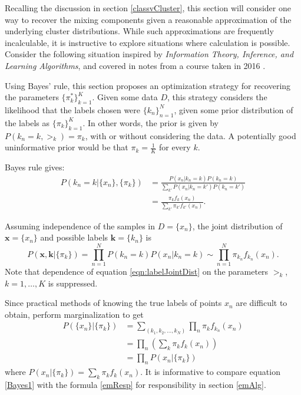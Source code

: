 Recalling the discussion in section \ref{classvCluster}, this section will consider one way to recover the mixing components given a reasonable approximation of the underlying cluster distributions. While such approximations are frequently incalculable, it is instructive to explore situations where calculation is possible. Consider the following situation inspired by \textit{Information Theory, Inference, and Learning Algorithms}\citep{MacKay2002}, and covered in notes from a course taken in 2016 \cite{rychlikCourse}.

Using Bayes' rule, this section proposes an optimization strategy for recovering the parameters $\{\pi_k^{\ast}\}_{k=1}^{K}$. Given some data $D$, this strategy considers the likelihood that the labels chosen were $\{k_n\}_{n=1}^{N}$, given some prior distribution of the labels as $\{\pi_k\}_{k=1}^{K}$. In other words, the prior is given by $P(k_n=k, \bm \gt_k) = \pi_k$, with or without considering the data. A potentially good uninformative prior would be that $\pi_k=\frac 1K$ for every $k$.

Bayes rule gives:
\begin{align}\label{Bayes1}
P(k_n=k|\{x_n\},\{\pi_k\})&=\frac{P(x_n|k_n=k)P(k_n=k)}{\sum_{k'}P(x_n|k_n=k')P(k_n=k')} \nonumber \\
						  &=\frac{\pi_k f_k(x_n)}{\sum_{k'}\pi_{k'} f_{k'}(x_n)}.
\end{align}

Assuming independence of the samples in \( D = \{x_n\} \), the joint distribution of $\bm x = \{x_n\}$ and possible labels $\bm k = \{k_n\}$ is 
\begin{equation}\label{eqn:labelJointDist}
P(\bm x, \bm k |\{\pi_k\})=\prod_{n=1}^{N} P(k_n=k)P(x_n|k_n=k) \sim\prod_{n=1}^{N} \pi_{k_n}f_{k_n}(x_n).
\end{equation}
Note that dependence of equation \eqref{eqn:labelJointDist} on the parameters \( \bm\gt_k \), \( k=1,\ldots,K \) is suppressed.

Since practical methods of knowing the true labels of points $x_n$ are difficult to obtain, perform marginalization to get
\begin{align*}
P(\{x_n\}|\{\pi_k\})&=\sum_{(k_1,k_2,\ldots,k_N)}\prod_n \pi_{k}f_{k_n}(x_n)\\
&= \prod_n \left(\sum_{k}\pi_kf_k(x_n)\right)\\
&= \prod_n P(x_n|\{\pi_k\})
\end{align*}
where $\displaystyle{P(x_n|\{\pi_k\}) =\sum_{k}\pi_kf_k(x_n)}$.  It is informative to compare equation \eqref{Bayes1} with the formula \eqref{emResp} for responsibility in section \ref{emAlg}.

